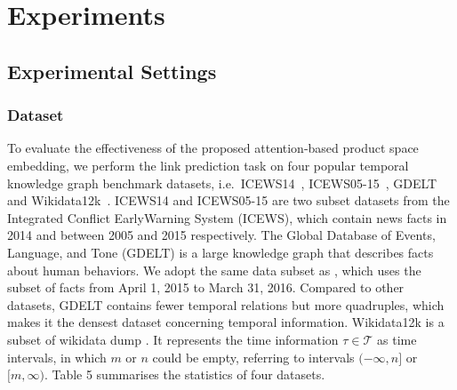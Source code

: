 \documentclass[letterpaper]{article} %
\begin{document}
\section{Experiments}



\subsection{Experimental Settings}
\subsubsection{Dataset}
To evaluate the effectiveness of the proposed attention-based product space embedding,
we perform the link prediction task on four popular temporal knowledge graph benchmark datasets, i.e.\ ICEWS14~\cite{garcia2018learning}, ICEWS05-15~\cite{garcia2018learning}, GDELT~\cite{trivedi2017know} and Wikidata12k~\cite{tcomplexlacroix2020tensor}. ICEWS14 and ICEWS05-15 are two subset datasets from the Integrated Conflict EarlyWarning System (ICEWS)\cite{lautenschlager2015icews}, which contain news facts in 2014 and between 2005 and 2015 respectively. The Global Database of Events, Language, and Tone (GDELT) is a large knowledge graph that describes facts about human behaviors. We adopt the same data subset as \cite{gao2020rotate3d}, which uses the subset of facts from April 1, 2015 to March 31, 2016. Compared to other datasets, GDELT contains fewer temporal relations but more quadruples, which makes it the densest dataset concerning temporal information. Wikidata12k is a subset of wikidata dump \cite{erxleben2014introducing}. It represents the time information $\tau \in \mathcal{T}$ as time intervals, in which $m$ or $n$ could be empty, referring to intervals $(-\infty,n]$ or $[m,\infty)$.
Table 5 summarises the statistics of four datasets.
\end{document}
